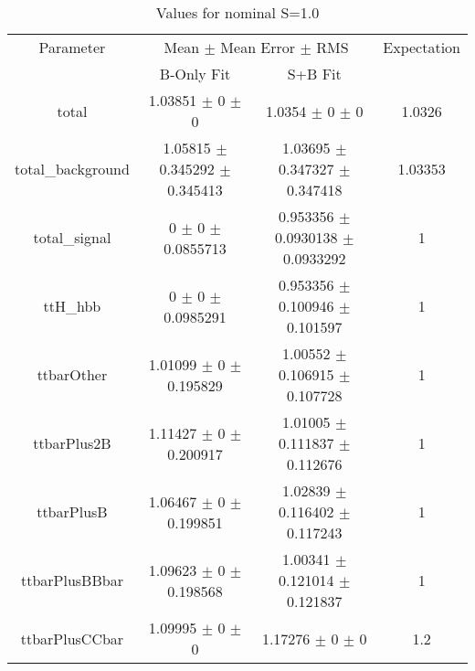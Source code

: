 \begin{table}
\centering
\caption{Values for nominal S=1.0}
\begin{tabular}{cccc}
\toprule
Parameter & \multicolumn{2}{c}{Mean $\pm$ Mean Error $\pm$ RMS} & Expectation\\
 & B-Only Fit & S+B Fit & \\
\midrule
total & \num{1.03851} $\pm$ \num{0} $\pm$ \num{0} & \num{1.0354} $\pm$ \num{0} $\pm$ \num{0} & \num{1.0326}\\
total\_background & \num{1.05815} $\pm$ \num{0.345292} $\pm$ \num{0.345413} & \num{1.03695} $\pm$ \num{0.347327} $\pm$ \num{0.347418} & \num{1.03353}\\
total\_signal & \num{0} $\pm$ \num{0} $\pm$ \num{0.0855713} & \num{0.953356} $\pm$ \num{0.0930138} $\pm$ \num{0.0933292} & \num{1}\\
ttH\_hbb & \num{0} $\pm$ \num{0} $\pm$ \num{0.0985291} & \num{0.953356} $\pm$ \num{0.100946} $\pm$ \num{0.101597} & \num{1}\\
ttbarOther & \num{1.01099} $\pm$ \num{0} $\pm$ \num{0.195829} & \num{1.00552} $\pm$ \num{0.106915} $\pm$ \num{0.107728} & \num{1}\\
ttbarPlus2B & \num{1.11427} $\pm$ \num{0} $\pm$ \num{0.200917} & \num{1.01005} $\pm$ \num{0.111837} $\pm$ \num{0.112676} & \num{1}\\
ttbarPlusB & \num{1.06467} $\pm$ \num{0} $\pm$ \num{0.199851} & \num{1.02839} $\pm$ \num{0.116402} $\pm$ \num{0.117243} & \num{1}\\
ttbarPlusBBbar & \num{1.09623} $\pm$ \num{0} $\pm$ \num{0.198568} & \num{1.00341} $\pm$ \num{0.121014} $\pm$ \num{0.121837} & \num{1}\\
ttbarPlusCCbar & \num{1.09995} $\pm$ \num{0} $\pm$ \num{0} & \num{1.17276} $\pm$ \num{0} $\pm$ \num{0} & \num{1.2}\\
\bottomrule
\end{tabular}
\end{table}